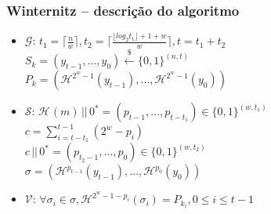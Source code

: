 \documentclass{beamer}
\newcommand{\concat}{\, \vert \vert \,}
\newcommand{\hash}[2][]{\mathcal{H}^{#1}(#2)}
\begin{document}
\begin{frame}
  \frametitle{Winternitz -- descrição do algoritmo}
  \begin{itemize}
    \item $\mathcal{G}$:
      $t_1 = \lceil \frac{n}{w} \rceil,
       t_2 = \lceil \frac{\lfloor log_2 t_1 \rfloor + 1 + w}{w} \rceil,
         t = t_1 + t_2$ \\

      \hspace{1.1em}
      $S_k = (y_{t - 1}, \dots, y_{0})
        \stackrel{\$}{\longleftarrow} \{0,1\}^{(n, t)}$ \\

      \hspace{1.1em}
      $P_k = (\hash[2^w - 1]{y_{t - 1}}, \dots, \hash[2^w - 1]{y_0})$

    \item $\mathcal{S}$:
      $\hash{m} \concat 0^*
        = (p_{t - 1}, \dots, p_{t - t_1}) \in \{0, 1\}^{(w, t_1)}$ \\

      \hspace{1.1em}
      $c = \sum_{i = t - t_1}^{t - 1} (2^w - p_i)$ \\

      \hspace{1.1em}
      $c \concat 0^* = (p_{t_2 - 1}, \dots, p_{0}) \in \{0, 1\}^{(w, t_2)}$ \\

      \hspace{1.1em}
      $\sigma = (\mathcal{H}^{p_{t - 1}}(y_{t - 1}),
        \dots, \mathcal{H}^{p_0}(y_0))$

    \item $\mathcal{V}$:
      $\forall \sigma_i \in \sigma,
        \hash[2^w - 1 - p_{i}]{\sigma_i} = P_{k_i}, 0 \leq i \leq t - 1$
  \end{itemize}
\end{frame}
\end{document}
